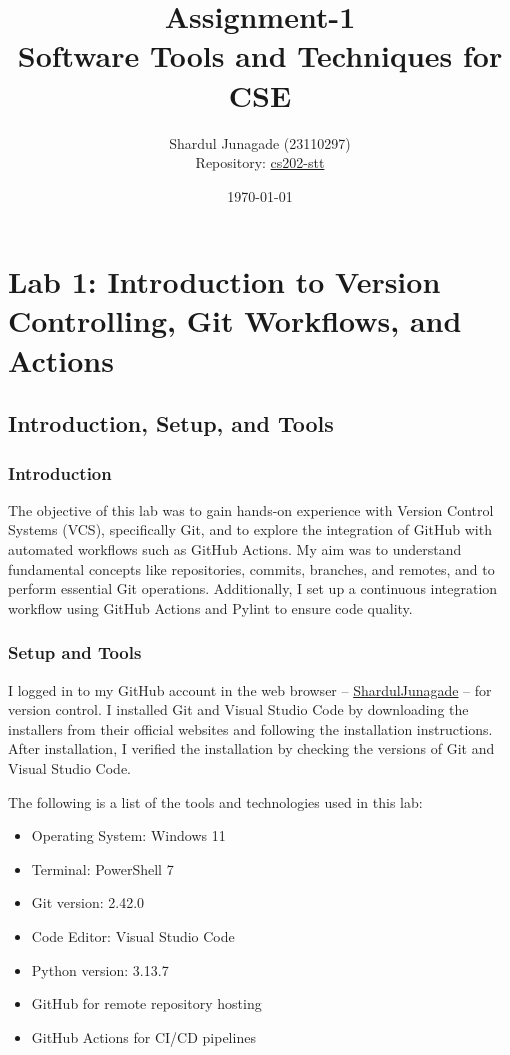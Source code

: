 \documentclass[10pt,a4paper]{report}
\title{\Huge Assignment-1 \\[0.5cm] \LARGE Software Tools and Techniques for CSE}
\author{\Large Shardul Junagade (23110297) \\[0.2cm] \Large Repository: \href{https://github.com/ShardulJunagade/cs202-stt}{cs202-stt}}
\date{\large \today}
\begin{document}
\maketitle
\newpage

\tableofcontents
\newpage


\chapter{Lab 1: Introduction to Version Controlling, Git Workflows, and Actions}


\section{Introduction, Setup, and Tools}

\subsection{Introduction}
The objective of this lab was to gain hands-on experience with Version Control Systems (VCS), specifically Git, and to explore the integration of GitHub with automated workflows such as GitHub Actions. My aim was to understand fundamental concepts like repositories, commits, branches, and remotes, and to perform essential Git operations. Additionally, I set up a continuous integration workflow using GitHub Actions and Pylint to ensure code quality.

\subsection{Setup and Tools}
I logged in to my GitHub account in the web browser -- \href{https://github.com/ShardulJunagade}{ShardulJunagade} -- for version control. I installed Git and Visual Studio Code by downloading the installers from their official websites and following the installation instructions. After installation, I verified the installation by checking the versions of Git and Visual Studio Code.

\begingroup
The following is a list of the tools and technologies used in this lab:
\begin{itemize}[itemsep=0.05em, topsep=0pt]
    \item Operating System: Windows 11
    \item Terminal: PowerShell 7
    \item Git version: 2.42.0
    \item Code Editor: Visual Studio Code
    \item Python version: 3.13.7
    \item GitHub for remote repository hosting
    \item GitHub Actions for CI/CD pipelines
\end{itemize}
\endgroup
\end{document}
